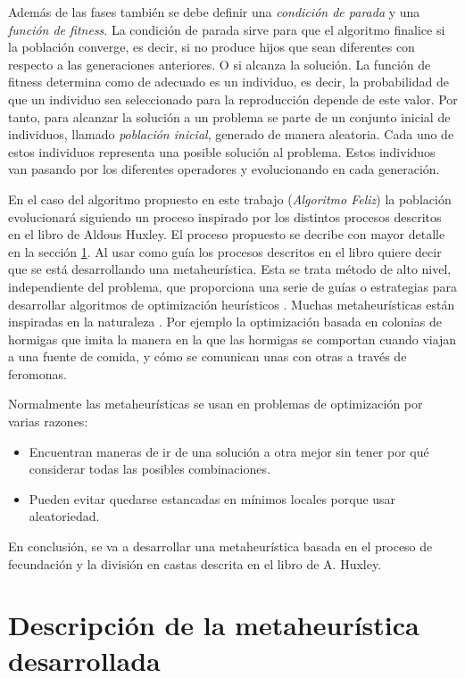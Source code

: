 Además de las fases también se debe definir una \emph{condición de parada} y una \emph{función de fitness}. La 
condición de parada sirve para que el algoritmo finalice si la población converge, es decir, si no produce hijos 
que sean diferentes con respecto a las generaciones anteriores. O si alcanza la solución. La función de fitness
determina como de adecuado es un individuo, es decir, la probabilidad de que un individuo sea seleccionado para 
la reproducción depende de este valor. Por tanto, para alcanzar la solución a un problema se parte de un conjunto 
inicial de individuos, llamado \textit{población inicial}, generado de manera aleatoria. Cada uno de estos 
individuos representa una posible solución al problema. Estos individuos van pasando por los diferentes operadores y 
evolucionando en cada generación.

En el caso del algoritmo propuesto en este trabajo (\emph{Algoritmo Feliz}) la población evolucionará siguiendo un proceso 
inspirado por los distintos procesos descritos en el libro de Aldous Huxley. El proceso propuesto se decribe con mayor detalle
en la sección \ref{sect: description}. Al usar como guía los procesos descritos en el libro quiere decir que se está desarrollando 
una metaheurística. Esta se trata método de alto nivel, independiente del problema, que proporciona una serie de guías o 
estrategias para desarrollar algoritmos de optimización heurísticos \cite{metaheuristics_def}. Muchas metaheurísticas
están inspiradas en la naturaleza \cite{Molina2020ComprehensiveTO}. Por ejemplo la optimización basada en colonias de
hormigas que imita la manera en la que las hormigas se comportan cuando viajan a una fuente de comida, y cómo se 
comunican unas con otras a través de feromonas. 

Normalmente las metaheurísticas se usan en problemas de optimización por varias razones:
\begin{itemize}
    \item Encuentran maneras de ir de una solución a otra mejor sin tener por qué considerar todas las posibles combinaciones. 
    \item Pueden evitar quedarse estancadas en mínimos locales porque usar aleatoriedad.
\end{itemize}

En conclusión, se va a desarrollar una metaheurística basada en el proceso de fecundación y la división en castas descrita en el 
libro de A. Huxley.

\section{Descripción de la metaheurística desarrollada} \label{sect: description}

